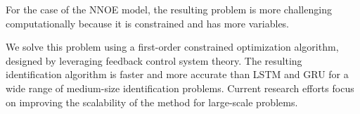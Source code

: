 For the case of the NNOE model, the resulting problem is more challenging computationally because it is constrained and has more variables.

We solve this problem using a first-order constrained optimization algorithm, designed by leveraging feedback control system theory. The resulting identification algorithm is faster and more accurate than LSTM and GRU for a wide range of medium-size identification problems. Current research efforts focus on improving the scalability of the method for large-scale problems.









